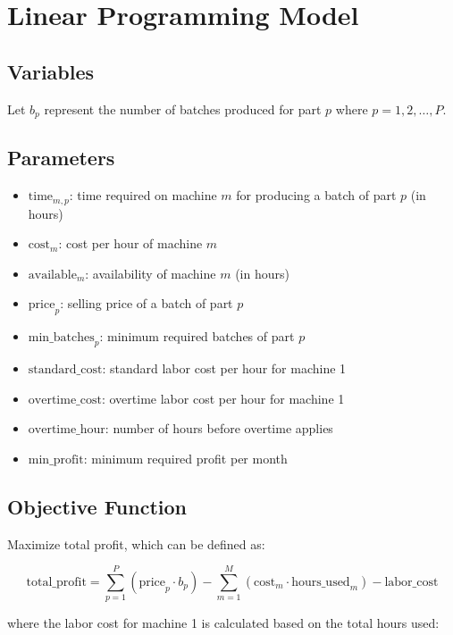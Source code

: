 \documentclass{article}
\begin{document}
\section*{Linear Programming Model}

\subsection*{Variables}
Let \( b_p \) represent the number of batches produced for part \( p \) where \( p = 1, 2, \ldots, P \).

\subsection*{Parameters}
\begin{itemize}
    \item \( \text{time}_{m,p} \): time required on machine \( m \) for producing a batch of part \( p \) (in hours)
    \item \( \text{cost}_m \): cost per hour of machine \( m \)
    \item \( \text{available}_m \): availability of machine \( m \) (in hours)
    \item \( \text{price}_p \): selling price of a batch of part \( p \)
    \item \( \text{min\_batches}_p \): minimum required batches of part \( p \)
    \item \( \text{standard\_cost} \): standard labor cost per hour for machine 1
    \item \( \text{overtime\_cost} \): overtime labor cost per hour for machine 1
    \item \( \text{overtime\_hour} \): number of hours before overtime applies
    \item \( \text{min\_profit} \): minimum required profit per month
\end{itemize}

\subsection*{Objective Function}
Maximize total profit, which can be defined as:

\[
\text{total\_profit} = \sum_{p=1}^{P} \left( \text{price}_p \cdot b_p \right) - \sum_{m=1}^{M} \left( \text{cost}_m \cdot \text{hours\_used}_m \right) - \text{labor\_cost}
\]

where the labor cost for machine 1 is calculated based on the total hours used:
\end{document}
